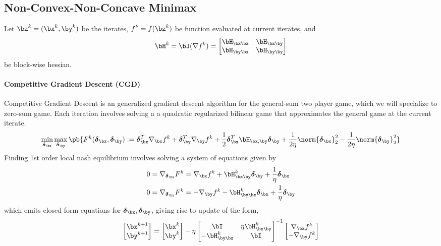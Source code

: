 \documentclass[../summary.tex]{subfiles}
\begin{document}
\subsection{Non-Convex-Non-Concave Minimax}

Let $\bz^k = (\bx^k, \by^k)$ be the iterates, $f^k = f(\bz^k)$ be function evaluated at current iterates, and 
\[
    \bH^k 
        = \bJ(\nabla f^k)
        = 
    \begin{bmatrix}
        \bH_{\bx\bx} & \bH_{\bx\by} \\
        \bH_{\by\bx} & \bH_{\by\by} \\
    \end{bmatrix}    
\]
be block-wise hessian.

\paragraph{Competitive Gradient Descent (CGD)} Competitive Gradient Descent \cite{schaferCompetitiveGradientDescent2019} is an generalized gradient descent algorithm for the general-sum two player game, which we will specialize to zero-sum game. Each iteration involves solving a a quadratic regularized bilinear game that approximates the general game at the current iterate. 
\begin{align*}
    \min_{\bdelta_{\bx}} \max_{\bdelta_{\by}} \pb{
        F^k(\bdelta_{\bx},\bdelta_{\by})
        := \bdelta_{\bx}^T \nabla_{\bx} f^k + \bdelta_{\by}^T \nabla_{\by} f^k + \frac{1}{2} \bdelta_{\bx}^T \bH_{\bx,\by} \bdelta_{\by} + \frac{1}{2\eta}\norm{\bdelta_{\bx}}_2^2 - \frac{1}{2\eta}\norm{\bdelta_{\by}}_2^2
    } 
\end{align*}
Finding 1st order local nash equilibrium involves solving a system of equations given by
\begin{align*}
    0 = \nabla_{\bdelta_{\bx}} F^k
        &= \nabla_{\bx} f^k + \bH_{\bx\by}^k \bdelta_{\by} + \frac{1}{\eta} \bdelta_{\bx} \\
    0 = \nabla_{\bdelta_{\by}} F^k
        &= - \nabla_{\by} f^k - \bH_{\by\bx}^k \bdelta_{\bx} + \frac{1}{\eta} \bdelta_{\by} 
\end{align*}
which emits closed form equations for $\bdelta_{\bx},\bdelta_{\by}$, giving rise to update of the form,
\begin{align*}
    \begin{bmatrix}
        \bx^{k+1}\\
        \by^{k+1}
    \end{bmatrix}
    = 
    \begin{bmatrix}
        \bx^{k}\\
        \by^{k}
    \end{bmatrix}
    - 
    \eta 
    \begin{bmatrix}
        \bI & \eta \bH^k_{\bx\by} \\
        -\bH^k_{\by\bx} & \bI
    \end{bmatrix}^{-1}
    \begin{bmatrix}
        \nabla_{\bx} f^k \\
        -\nabla_{\by} f^k
    \end{bmatrix}
\end{align*}
\end{document}
